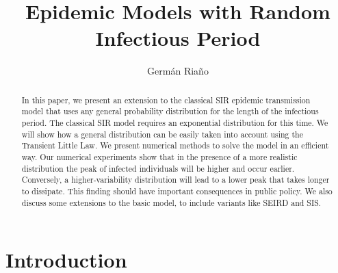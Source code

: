 \documentclass[USenglish,10pt]{article}
\begin{document}



\title{Epidemic Models with Random Infectious Period}
\author{Germ\'an Ria\~no}
\maketitle


\begin{abstract}
In this paper, we present an extension to the classical SIR epidemic transmission model that uses any general probability distribution for the length of the infectious period.
The classical SIR model requires an exponential distribution for this time. We will show how a general distribution can be easily taken into account using the Transient Little Law.
We present numerical methods to solve the model in an efficient way. Our numerical experiments show that in the presence of a more realistic distribution the peak of infected individuals will be higher and occur earlier.
Conversely, a higher-variability distribution will lead to a lower peak that takes longer to dissipate.
This finding should have important consequences in public policy.
We also discuss some extensions to the basic model, to include variants like SEIRD and SIS.
\end{abstract}



\pagestyle{plain} %









\section{Introduction}\label{intro}
\end{document}
